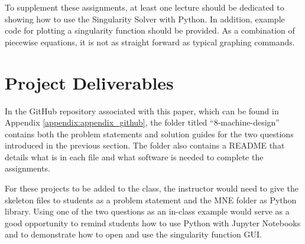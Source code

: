 To supplement these assignments, at least one lecture should be dedicated to showing how to use the Singularity 
Solver with Python. In addition, example code for plotting a singularity function should be provided. As a 
combination of piecewise equations, it is not as straight forward as typical graphing commands.

\section{Project Deliverables}

In the GitHub repository associated with this paper, which can be found in Appendix \ref{appendix:appendix_github},
the folder titled ``8-machine-design'' contains both the problem statements and solution guides for the two questions
introduced in the previous section. The folder also contains a README that details what is in each file and 
what software is needed to complete the assignments. 

For these projects to be added to the class, the instructor would  need to give the skeleton files to 
students as a problem statement and the MNE folder as Python library. Using one of the two questions as an in-class
example would serve as a good opportunity to remind students how to use Python with Jupyter Notebooks and to 
demonstrate how to open and use the singularity function GUI.
